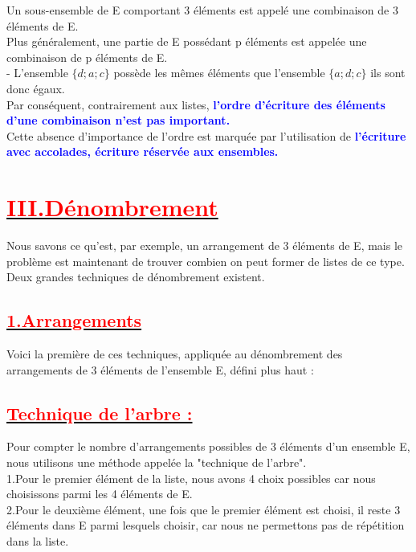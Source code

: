 \documentclass[12pt]{article}
\begin{document}
Un sous-ensemble de E comportant 3 éléments est appelé une combinaison de 3 éléments de E.\\

Plus généralement, une partie de E possédant p éléments est appelée une combinaison de p éléments de E.\\

- L’ensemble $\lbrace d ; a ; c \rbrace$ possède les mêmes éléments que l’ensemble $\lbrace a ; d ; c \rbrace$ ils sont donc égaux.\\
Par conséquent, contrairement aux listes, \textbf{\textcolor{blue}{l’ordre d’écriture des éléments d’une combinaison n'est pas important.}}\\

Cette absence d’importance de l’ordre est marquée par l’utilisation de 
\textbf{\textcolor{blue}{l’écriture avec accolades, écriture réservée aux ensembles.}}
\section*{\underline{\textbf{\textcolor{red}{III.Dénombrement}}}}
Nous savons ce qu’est, par exemple, un arrangement de 3 éléments de E, mais le problème est maintenant de trouver combien on peut former de listes de ce type.\\
Deux grandes techniques de dénombrement existent. 
\subsection*{\underline{\textbf{\textcolor{red}{1.Arrangements}}}}
Voici la première de ces techniques, appliquée au dénombrement des arrangements de 3 éléments
de l’ensemble E, défini plus haut : \\
\subsection*{\underline{\textbf{\textcolor{red}{Technique de l’arbre :}}}}
Pour compter le nombre d'arrangements possibles de 3 éléments d'un ensemble E, nous utilisons une méthode appelée la "technique de l'arbre".\\

    1.Pour le premier élément de la liste, nous avons 4 choix possibles car nous choisissons parmi les 4 éléments de E.\\

    2.Pour le deuxième élément, une fois que le premier élément est choisi, il reste 3 éléments dans E parmi lesquels choisir, car nous ne permettons pas de répétition dans la liste.\\
\end{document}
